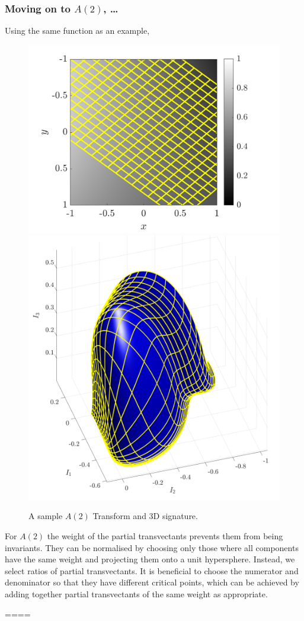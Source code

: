 \documentclass[review,onefignum,onetabnum]{siamonline190516}
\begin{document}
{\subsubsection{Moving on to $A(2)$, \ldots}
Using the same function as an example, 
\begin{figure}
\centering
\includegraphics[width=.45\textwidth]{Figs/f_transformed_A2.png}
\includegraphics[width=.45\textwidth]{Figs/A2_signature.png}
\caption{A sample $A(2)$ Transform and 3D signature.}
\label{fig:A2}
\end{figure}

For $A(2)$ the weight of the partial transvectants prevents them from being invariants. They can be normalised by choosing only those where all components have the same weight and projecting them onto a unit hypersphere. Instead, we select ratios of partial transvectants. It is beneficial to choose the numerator and denominator so that they have different critical points, which can be achieved by adding together partial transvectants of the same weight as appropriate.

====

}
\end{document}

